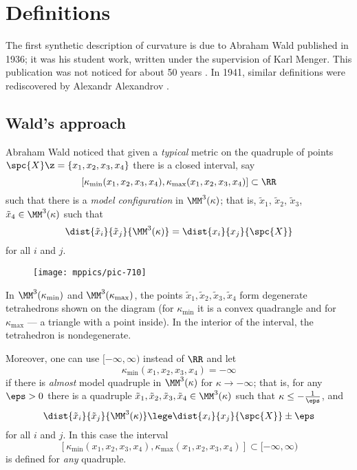 \chapter{Definitions}

The first synthetic description of curvature is due to Abraham Wald \cite{wald} published in 1936;
it was his student work, written under the supervision of Karl Menger. 
This publication was not noticed for about 50 years \cite{berestovskii}.
In 1941, similar definitions were rediscovered by Alexandr Alexandrov \cite{alexandrov:def}.



\section{Wald's approach}

Abraham Wald noticed that given a \textit{typical} metric on the quadruple of points $\spc{X}\z=\{x_1,x_2,x_3,x_4\}$ there is a closed interval,
say 
\[[\kappa_{\min}(x_1,x_2,x_3,x_4),\kappa_{\max}(x_1,x_2,x_3,x_4)]\subset \RR\]
such that there is a \textit{model configuration} in $\MM^3(\kappa)$;
that is, $\tilde x_1$, $\tilde x_2$, $\tilde x_3$, $\tilde x_4\in\MM^3(\kappa)$ such that
\[\dist{\tilde x_i}{\tilde x_j}{\MM^3(\kappa)}=\dist{x_i}{x_j}{\spc{X}}\]
for all $i$ and $j$.


\begin{wrapfigure}{r}{33mm}
\vskip-2mm
\centering
\texttt{[image: mppics/pic-710]}
\end{wrapfigure}

In $\MM^3(\kappa_{\min})$ and $\MM^3(\kappa_{\max})$, the points $\tilde x_1,\tilde x_2,\tilde x_3,\tilde x_4$ form degenerate tetrahedrons shown on the diagram (for $\kappa_{\min}$ it is a convex quadrangle and for $\kappa_{\max}$ --- a triangle with a point inside).
In the interior of the interval, the tetrahedron is nondegenerate.

Moreover, one can use $[-\infty,\infty)$ instead of $\RR$ 
and let
\[\kappa_{\min}(x_1,x_2,x_3,x_4)=-\infty\]
if there is \textit{almost} model quadruple in
$\MM^3(\kappa)$ for $\kappa\to -\infty$;
that is, for any $\eps>0$ there is a quadruple
$\tilde x_1,\tilde x_2,\tilde x_3,\tilde x_4\in\MM^3(\kappa)$
such that $\kappa\le -\tfrac1\eps$, and
\[\dist{\tilde x_i}{\tilde x_j}{\MM^3(\kappa)}\lege\dist{x_i}{x_j}{\spc{X}}\pm\eps\]
for all $i$ and $j$.
In this case the interval 
\[[\kappa_{\min}(x_1,x_2,x_3,x_4),\kappa_{\max}(x_1,x_2,x_3,x_4)]\subset [-\infty,\infty)\]
is defined for \textit{any} quadruple.


